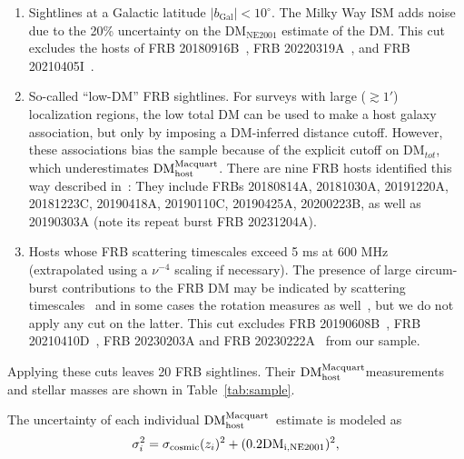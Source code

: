 \documentclass[twocolumn,linenumbers]{aastex631}
\newcommand{\dm}{\ensuremath{\rm DM}}
\newcommand{\dmhm}{\ensuremath{{\rm DM}_\textrm{host}^\textrm{Macquart}}}
\newcommand{\sigmacosmic}{\ensuremath{{\sigma}_\textrm{cosmic}}}
\begin{document}
\begin{enumerate}
    \item Sightlines at a Galactic latitude $|b_\mathrm{Gal}| < 10^\circ$. The Milky Way ISM adds noise due to the 20\% uncertainty on the DM$_\mathrm{NE2001}$ estimate of the DM. This cut excludes the hosts of FRB 20180916B~\citep{collaboration2020periodic,marcote2020repeating}, FRB 20220319A~\citep{ravi2025deep}, and FRB 20210405I~\citep{driessen2024frb}. 
    \item So-called ``low-DM'' FRB sightlines. For surveys with large ($\gtrsim 1'$) localization regions, the low total DM can be used to make a host galaxy association, but only by imposing a DM-inferred distance cutoff. However, these associations bias the sample because of the explicit cutoff on DM$_{tot}$, which underestimates $\dmhm$. There are nine FRB hosts identified this way described in~\citet{bhardwaj2021local,michilli2023subarcminute,bhardwaj2024host,Ibik2024host}: They include FRBs 20180814A, 20181030A, 20191220A, 20181223C, 20190418A, 20190110C, 20190425A, 20200223B, as well as 20190303A (note its repeat burst FRB 20231204A). %
    \item Hosts whose FRB scattering timescales exceed 5 ms at 600 MHz (extrapolated using a $\nu^{-4}$ scaling if necessary). The presence of large circum-burst contributions to the FRB DM may be indicated by scattering timescales~\citep{cordes2016radio, ocker2022large,caleb2023subarc} and in some cases the rotation measures as well~\citep{michilli2018extreme,mannings2023}, but we do not apply any cut on the latter. This cut excludes FRB 20190608B~\citep{chittidi2021dissecting}, FRB 20210410D~\citep{caleb2023subarc}, FRB 20230203A and FRB 20230222A~\citep{chime2025catalog} from our sample. 
\end{enumerate}

Applying these cuts leaves 20 FRB sightlines. Their \dmhm measurements and stellar masses are shown in Table~\ref{tab:sample}.

The uncertainty of each individual \dmhm\ estimate is modeled as
\begin{equation}
    \sigma_{i}^2 = \sigmacosmic(z_i)^2 + (0.2 \dm_\mathrm{i,NE2001})^2,
    \label{eq:sigma_i_def}
\end{equation}
\end{document}
